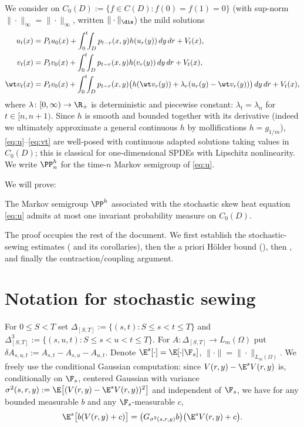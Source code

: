 We consider on $C_0(D):=\{f\in C(D):f(0)=f(1)=0\}$ (with sup-norm $\|\cdot\|_\infty=\|\cdot\|_\infty$, written $\|\cdot\|_\dis$) the mild solutions
\begin{align}
u_t(x)&=P_tu_0(x)+\int_0^t\!\!\int_D p_{t-r}(x,y)h(u_r(y))\,dy\,dr+V_t(x),\label{eq:u}\\
v_t(x)&=P_tv_0(x)+\int_0^t\!\!\int_D p_{t-r}(x,y)h(v_r(y))\,dy\,dr+V_t(x),\label{eq:v}\\
\wt v_t(x)&=P_tv_0(x)+\int_0^t\!\!\int_D p_{t-r}(x,y)\big(h(\wt v_r(y))+\lambda_r(u_r(y)-\wt v_r(y))\big)\,dy\,dr+V_t(x),\label{eq:vt}
\end{align}
where $\lambda\colon[0,\infty)\to\R_+$ is deterministic and piecewise constant: $\lambda_t=\lambda_n$ for $t\in[n,n+1)$. Since $h$ is smooth and bounded together with its derivative (indeed we ultimately approximate a general continuous $h$ by mollifications $h=g_{1/m}$), \eqref{eq:u}--\eqref{eq:vt} are well-posed with continuous adapted solutions taking values in $C_0(D)$; this is classical for one-dimensional SPDEs with Lipschitz nonlinearity. We write $\PP^h_n$ for the time-$n$ Markov semigroup of \eqref{eq:u}.

We will prove:

\begin{theorem}\label{thm:main}
The Markov semigroup $\PP^h$ associated with the stochastic skew heat equation \eqref{eq:u} admits at most one invariant probability measure on $C_0(D)$.
\end{theorem}

The proof occupies the rest of the document. We first establish the stochastic-sewing estimates ( and its corollaries), then the a priori Hölder bound (), then , and finally the contraction/coupling argument.

\section{Notation for stochastic sewing}

For $0\le S<T$ set $\Delta_{[S,T]}:=\{(s,t):S\le s<t\le T\}$ and $\Delta^3_{[S,T]}:=\{(s,u,t):S\le s<u<t\le T\}$. For $A\colon\Delta_{[S,T]}\to L_m(\Omega)$ put $\delta A_{s,u,t}:=A_{s,t}-A_{s,u}-A_{u,t}$. Denote $\E^s[\cdot]=\E[\cdot|\F_s]$, $\|\cdot\|=\|\cdot\|_{L_m(\Omega)}$. We freely use the conditional Gaussian computation: since $V(r,y)-\E^s V(r,y)$ is, conditionally on $\F_s$, centered Gaussian with variance $\sigma^2(s,r,y):=\E\big[(V(r,y)-\E^s V(r,y))^2\big]$ and independent of $\F_s$, we have for any bounded measurable $b$ and any $\F_s$-measurable $c$,
\begin{equation}\label{eq:condgauss}
\E^s\big[b(V(r,y)+c)\big]=\big(G_{\sigma^2(s,r,y)}b\big)\big(\E^s V(r,y)+c\big).
\end{equation}

